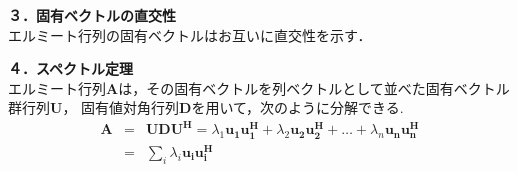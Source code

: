 \vspace{5mm}
\noindent\textbf{３．固有ベクトルの直交性} \\
エルミート行列の固有ベクトルはお互いに直交性を示す． \\

\vspace{5mm}
\noindent\textbf{４．スペクトル定理} \\
エルミート行列$\bm{A}$は，その固有ベクトルを列ベクトルとして並べた固有ベクトル群行列$\bm{U}$，
固有値対角行列$\bm{D}$を用いて，次のように分解できる. \\
\begin{eqnarray}
    \bm{A} &=& \bm{UDU^H} = \lambda_1\bm{u_1u_1^H}+\lambda_2\bm{u_2u_2^H}+\ldots+\lambda_n\bm{u_nu_n^H} \nonumber \\
    &=& \sum_i \lambda_i\bm{u_iu_i^H}
\end{eqnarray}

